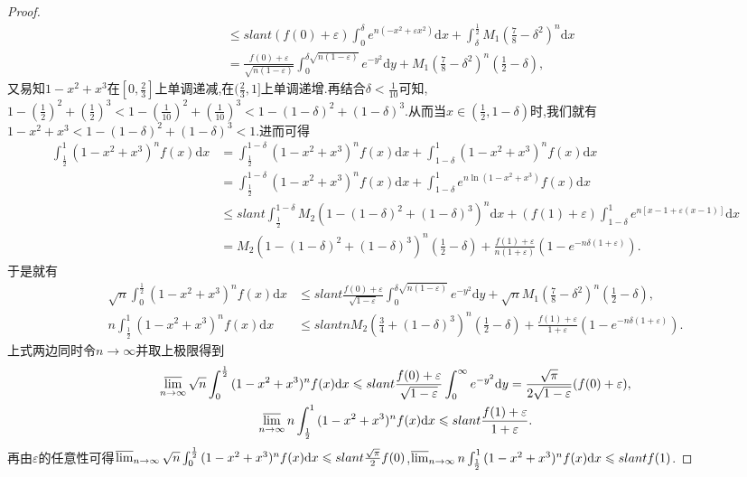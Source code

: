 \documentclass[../../main.tex]{subfiles}
\begin{document}
\begin{proof}
\begin{align*}
&\leqslant slant (f(0) + \varepsilon)\int_0^{\delta}{e^{n(-x^2 + \varepsilon x^2)}\mathrm{d}x}+\int_{\delta}^{\frac{1}{2}}{M_1\left(\frac{7}{8}-\delta^2\right)^n\mathrm{d}x}\\
&=\frac{f(0) + \varepsilon}{\sqrt{n(1 - \varepsilon)}}\int_0^{\delta\sqrt{n(1 - \varepsilon)}}{e^{-y^2}\mathrm{d}y}+M_1\left(\frac{7}{8}-\delta^2\right)^n\left(\frac{1}{2}-\delta\right),
\end{align*}
又易知$1-x^2+x^3$在$[0,\frac{2}{3}]$上单调递减,在$(\frac{2}{3},1]$上单调递增.再结合$\delta<\frac{1}{10}$可知,$1-(\frac{1}{2})^2+(\frac{1}{2})^3<1-(\frac{1}{10})^2+(\frac{1}{10})^3<1-(1-\delta)^2+(1-\delta)^3$.从而当$x\in (\frac{1}{2},1-\delta)$时,我们就有$1-x^2+x^3<1-(1-\delta)^2+(1-\delta)^3<1$.进而可得
\begin{align*}
\int_{\frac{1}{2}}^1{(1 - x^2 + x^3)^nf(x)\mathrm{d}x}&=\int_{\frac{1}{2}}^{1 - \delta}{(1 - x^2 + x^3)^nf(x)\mathrm{d}x}+\int_{1 - \delta}^1{(1 - x^2 + x^3)^nf(x)\mathrm{d}x}\\
&=\int_{\frac{1}{2}}^{1 - \delta}{(1 - x^2 + x^3)^nf(x)\mathrm{d}x}+\int_{1 - \delta}^1{e^{n\ln(1 - x^2 + x^3)}f(x)\mathrm{d}x}\\
&\leqslant slant \int_{\frac{1}{2}}^{1 - \delta}{M_2\left(1-(1-\delta)^2+(1 - \delta)^3\right)^n\mathrm{d}x}+(f(1) + \varepsilon)\int_{1 - \delta}^1{e^{n[x - 1 + \varepsilon(x - 1)]}\mathrm{d}x}\\
&=M_2\left(1-(1-\delta)^2+(1 - \delta)^3\right)^n\left(\frac{1}{2}-\delta\right)+\frac{f(1) + \varepsilon}{n(1 + \varepsilon)}\left(1 - e^{-n\delta(1 + \varepsilon)}\right).
\end{align*}
于是就有
\begin{align*}
\sqrt{n}\int_0^{\frac{1}{2}}{(1 - x^2 + x^3)^nf(x)\mathrm{d}x}&\leqslant slant \frac{f(0) + \varepsilon}{\sqrt{1 - \varepsilon}}\int_0^{\delta\sqrt{n(1 - \varepsilon)}}{e^{-y^2}\mathrm{d}y}+\sqrt{n} M_1\left(\frac{7}{8}-\delta^2\right)^n\left(\frac{1}{2}-\delta\right),\\
n\int_{\frac{1}{2}}^1{(1 - x^2 + x^3)^nf(x)\mathrm{d}x}&\leqslant slant n M_2\left(\frac{3}{4}+(1 - \delta)^3\right)^n\left(\frac{1}{2}-\delta\right)+\frac{f(1) + \varepsilon}{1 + \varepsilon}\left(1 - e^{-n\delta(1 + \varepsilon)}\right).
\end{align*}
上式两边同时令\(n\rightarrow\infty\)并取上极限得到
\begin{gather*}
\varlimsup_{n\rightarrow\infty}\sqrt{n}\int_0^{\frac{1}{2}}{(1 - x^2 + x^3)^nf(x)\mathrm{d}x}\leqslant slant \frac{f(0) + \varepsilon}{\sqrt{1 - \varepsilon}}\int_0^{\infty}{e^{-y^2}\mathrm{d}y}=\frac{\sqrt{\pi}}{2\sqrt{1 - \varepsilon}}(f(0) + \varepsilon),\\
\varlimsup_{n\rightarrow\infty}n\int_{\frac{1}{2}}^1{(1 - x^2 + x^3)^nf(x)\mathrm{d}x}\leqslant slant \frac{f(1) + \varepsilon}{1 + \varepsilon}.
\end{gather*}
再由\(\varepsilon\)的任意性可得\(\varlimsup_{n\rightarrow\infty}\sqrt{n}\int_0^{\frac{1}{2}}{(1 - x^2 + x^3)^nf(x)\mathrm{d}x}\leqslant slant \frac{\sqrt{\pi}}{2}f(0)\),\(\varlimsup_{n\rightarrow\infty}n\int_{\frac{1}{2}}^1{(1 - x^2 + x^3)^nf(x)\mathrm{d}x}\leqslant slant f(1)\).


\end{proof}
\end{document}
